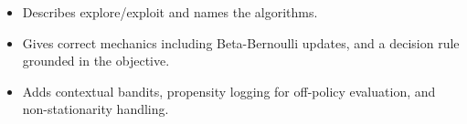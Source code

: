 \begin{interviewq}

\goodgreat
\begin{itemize}
    \item {} Describes explore/exploit and names the algorithms.
    \item {} Gives correct mechanics including Beta-Bernoulli updates, and a decision rule grounded in the objective.
    \item {} Adds contextual bandits, propensity logging for off-policy evaluation, and non-stationarity handling.
\end{itemize}

\end{interviewq}

